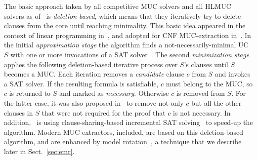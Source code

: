 \documentclass[twoside,11pt]{article}
\newcommand\haifamuc{\tool{HaifaMUC}\xspace}
\begin{document}
The basic approach taken by all competitive MUC solvers and all HLMUC solvers as of~\cite{N10} is \emph{deletion-based}, which means that they iteratively try to delete clauses from the core until reaching minimality.
This basic idea appeared in the context of linear programming in~\cite{DBLP:journals/informs/ChinneckD91,DBLP:conf/ijcai/BakkerDTW93}, and adopted for CNF MUC-extraction in~\cite{NadelPhd,DHN06}. In the initial \emph{approximation stage} the algorithm finds a not-necessarily-minimal UC $S$ with one or more invocations of a SAT solver~\cite{ZM03,GN03}. The second \emph{minimization stage} applies the following deletion-based iterative process over $S$'s clauses until $S$ becomes a MUC. Each iteration removes a \emph{candidate} clause $c$ from $S$ and invokes a SAT solver. If the resulting formula is satisfiable, $c$ must belong to the MUC, so $c$ is returned to $S$ and marked as \emph{necessary}. Otherwise $c$ is removed from $S$. For the latter case, it was also proposed in~\cite{NadelPhd,DHN06} to remove not only $c$ but all the other clauses in $S$ that were not required for the proof that $c$ is not necessary. In addition,~\cite{NadelPhd,DHN06} is using clause-sharing-based incremental SAT solving~\cite{DBLP:conf/charme/Shtrichman01,DBLP:conf/dac/WhittemoreKS01} to speed-up the algorithm. Modern MUC extractors, \haifamuc included, are based on this deletion-based algorithm, and are enhanced by model rotation~\cite{SL11,BM11,DBLP:journals/aicom/BelovLM12}, a technique that we describe later in Sect.~\ref{sec:emr}.
\end{document}
